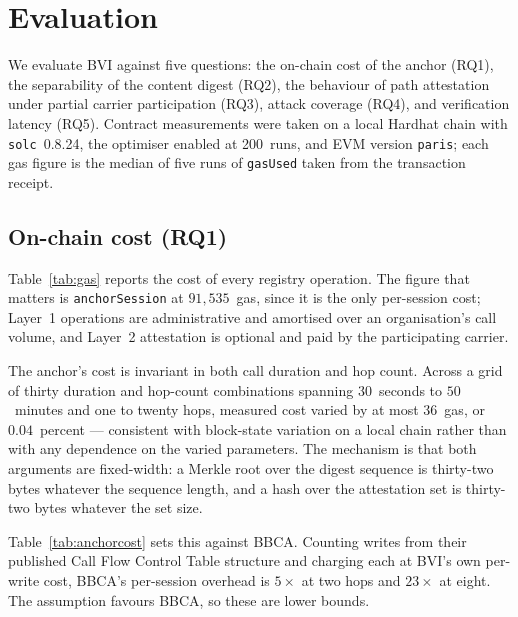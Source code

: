 %

\section{Evaluation}
\label{sec:evaluation}

We evaluate BVI against five questions: the on-chain cost of the anchor
(RQ1), the separability of the content digest (RQ2), the behaviour of path
attestation under partial carrier participation (RQ3), attack coverage (RQ4),
and verification latency (RQ5). Contract measurements were taken on a local
Hardhat chain with \texttt{solc}~0.8.24, the optimiser enabled at 200~runs, and
EVM version \texttt{paris}; each gas figure is the median of five runs of
\texttt{gasUsed} taken from the transaction receipt.

\subsection{On-chain cost (RQ1)}

Table~\ref{tab:gas} reports the cost of every registry operation. The figure
that matters is \texttt{anchorSession} at $91{,}535$~gas, since it is the only
per-session cost; Layer~1 operations are administrative and amortised over an
organisation's call volume, and Layer~2 attestation is optional and paid by the
participating carrier.

The anchor's cost is invariant in both call duration and hop count. Across a
grid of thirty duration and hop-count combinations spanning $30$~seconds to
$50$~minutes and one to twenty hops, measured cost varied by at most $36$~gas,
or $0.04$~percent --- consistent with block-state variation on a local chain
rather than with any dependence on the varied parameters. The mechanism is that
both arguments are fixed-width: a Merkle root over the digest sequence is
thirty-two bytes whatever the sequence length, and a hash over the attestation
set is thirty-two bytes whatever the set size.

Table~\ref{tab:anchorcost} sets this against BBCA. Counting writes from their
published Call Flow Control Table structure and charging each at BVI's own
per-write cost, BBCA's per-session overhead is $5\times$ at two hops and
$23\times$ at eight. The assumption favours BBCA, so these are lower bounds.

